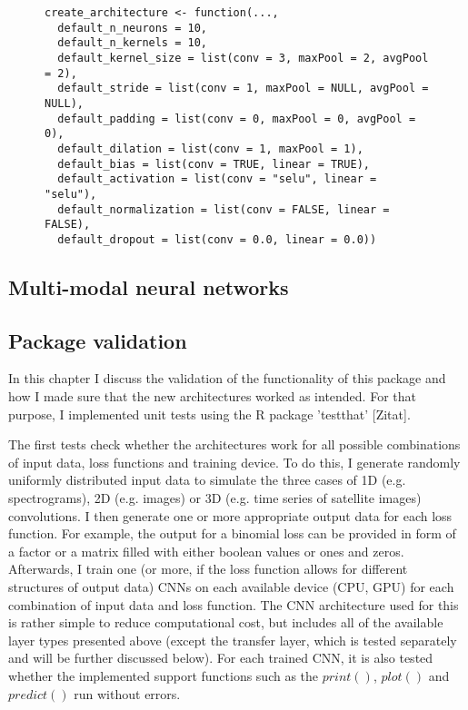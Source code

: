 \documentclass{article}
\begin{document}
\begin{figure}[H]
	\centering
	\newsavebox{\lstbox} %
	\begin{lrbox}{\lstbox}
		\begin{lstlisting}
create_architecture <- function(...,
  default_n_neurons = 10,
  default_n_kernels = 10,
  default_kernel_size = list(conv = 3, maxPool = 2, avgPool = 2),
  default_stride = list(conv = 1, maxPool = NULL, avgPool = NULL),
  default_padding = list(conv = 0, maxPool = 0, avgPool = 0),
  default_dilation = list(conv = 1, maxPool = 1),
  default_bias = list(conv = TRUE, linear = TRUE),
  default_activation = list(conv = "selu", linear = "selu"),
  default_normalization = list(conv = FALSE, linear = FALSE),
  default_dropout = list(conv = 0.0, linear = 0.0))
		\end{lstlisting}
	\end{lrbox}
	\resizebox{\textwidth}{!}{\usebox{\lstbox}}
\end{figure}
\subsection{Multi-modal neural networks}

\subsection{Package validation}
In this chapter I discuss the validation of the functionality of this package and how I made sure that the new architectures worked as intended. For that purpose, I implemented unit tests using the R package 'testthat' [Zitat].

The first tests check whether the architectures work for all possible combinations of input data, loss functions and training device. To do this, I generate randomly uniformly distributed input data to simulate the three cases of 1D (e.g. spectrograms), 2D (e.g. images) or 3D (e.g. time series of satellite images) convolutions. I then generate one or more appropriate output data for each loss function. For example, the output for a binomial loss can be provided in form of a factor or a matrix filled with either boolean values or ones and zeros. Afterwards, I train one (or more, if the loss function allows for different structures of output data) CNNs on each available device (CPU, GPU) for each combination of input data and loss function. The CNN architecture used for this is rather simple to reduce computational cost, but includes all of the available layer types presented above (except the transfer layer, which is tested separately and will be further discussed below). For each trained CNN, it is also tested whether the implemented support functions such as the $print()$, $plot()$ and $predict()$ run without errors.
\end{document}
